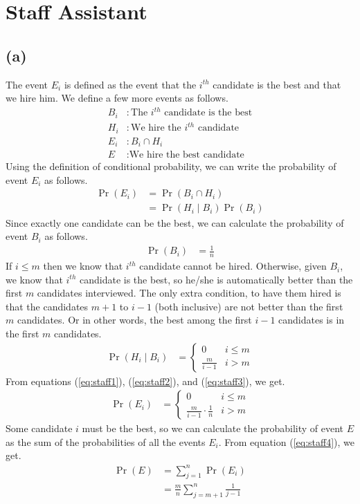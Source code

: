 \section{Staff Assistant}
\subsection*{(a)}
The event $E_i$ is defined as the event that the $i^{th}$ candidate is the best and that we hire him.
We define a few more events as follows.
\begin{align*}
	B_i & : \text{The $i^{th}$ candidate is the best} \\
	H_i & : \text{We hire the $i^{th}$ candidate}     \\
	E_i & : B_i \cap H_i                              \\
	E   & : \text{We hire the best candidate}
\end{align*}
Using the definition of conditional probability, we can write the probability of event $E_i$ as follows.
\begin{align}\label{eq:staff1}
	\Pr(E_i) & = \Pr(B_i \cap H_i)         \nonumber \\
	         & = \Pr(H_i \mid B_i)\Pr(B_i)
\end{align}
Since exactly one candidate can be the best, we can calculate the probability of event $B_i$ as follows.
\begin{align}\label{eq:staff2}
	\Pr(B_i) & = \frac{1}{n}
\end{align}
If $i\leq m$ then we know that $i^{th}$ candidate cannot be hired. Otherwise, given $B_i$, we know that $i^{th}$ candidate is the best, so he/she is automatically better than the first $m$ candidates interviewed.
The only extra condition, to have them hired is that the candidates $m+1$ to $i-1$ (both inclusive) are not better than the first $m$ candidates.
Or in other words, the best among the first $i-1$ candidates is in the first $m$ candidates.
\begin{align}\label{eq:staff3}
	\Pr(H_i \mid B_i) & =
	\begin{cases}
		0             & i\leq m \\
		\frac{m}{i-1} & i > m
	\end{cases}
\end{align}
From equations (\ref{eq:staff1}), (\ref{eq:staff2}), and (\ref{eq:staff3}), we get.
\begin{align}\label{eq:staff4}
	\Pr(E_i) & =
	\begin{cases}
		0                             & i\leq m \\
		\frac{m}{i-1}\cdot\frac{1}{n} & i > m
	\end{cases}
\end{align}
Some candidate $i$ must be the best, so we can calculate the probability of event $E$ as the sum of the probabilities of all the events $E_i$.
From equation (\ref{eq:staff4}), we get.
\begin{align}\label{eq:PrE}
	\Pr(E) & = \sum_{j = 1}^{n} \Pr(E_i)                    \nonumber \\
	       & = \frac{m}{n} \sum_{j = m+1}^{n} \frac{1}{j-1}
\end{align}

